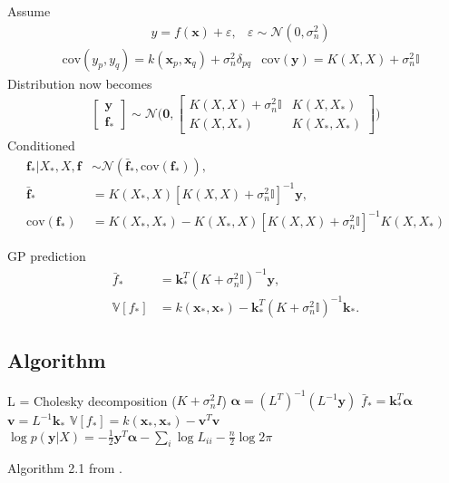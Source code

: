 \documentclass[twoside,english]{uiofysmaster}
\begin{document}
Assume
\begin{align}
&y = f(\textbf{x}) + \varepsilon, &\varepsilon \sim \mathcal{N}(0, \sigma_n^2)
\end{align}
\begin{align}
&\text{cov}(y_p, y_q) = k(\textbf{x}_p, \textbf{x}_q) + \sigma_n^2 \delta_{pq} &\text{cov}(\textbf{y}) = K(X, X) + \sigma_n^2 \mathbb{I}
\end{align}
Distribution now becomes
\begin{align}
\begin{bmatrix}
\textbf{y}\\
\textbf{f}_*
\end{bmatrix}
\sim 
\mathcal{N} \Bigg(
\boldsymbol{0},
\begin{bmatrix}
K(X, X) + \sigma_n^2 \mathbb{I} & K(X, X_*)\\
K(X, X_*) & K(X_*, X_*)
\end{bmatrix}
 \Bigg)
\end{align}
Conditioned
\begin{align}
\textbf{f}_* \big| X_*, X, \textbf{f} &\sim \mathcal{N}(\bar{\textbf{f}}_*, \text{cov}(\textbf{f}_*)),\\
\bar{\textbf{f}}_* &= K(X_*, X) [K(X, X) + \sigma_n^2 \mathbb{I}]^{-1} \textbf{y},\\
\text{cov} (\textbf{f}_*) &= K(X_*, X_*) - K(X_*, X)[K(X, X) + \sigma_n^2 \mathbb{I}]^{-1} K(X, X_*)
\end{align}

GP prediction
\begin{align}
\bar{f}_* &= \textbf{k}_*^T(K + \sigma_n^2\mathbb{I})^{-1} \textbf{y},\label{1}\\
\mathbb{V}[f_*] &= k(\textbf{x}_*, \textbf{x}_*) - \textbf{k}_*^T(K + \sigma_n^2 \mathbb{I})^{-1} \textbf{k}_*.
\end{align}

\subsection{Algorithm}

\begin{algorithm}
L = Cholesky decomposition ($K + \sigma_n^2 I$) \;
$\boldsymbol{\alpha} = (L^T)^{-1}(L^{-1} \textbf{y})$ \;
$\bar{f}_* = \textbf{k}_*^T \boldsymbol{\alpha}$ \;
$\textbf{v} = L^{-1} \textbf{k}_*$ \;
$\mathbb{V}[f_*] = k(\textbf{x}_*, \textbf{x}_*) - \textbf{v}^T \textbf{v}$ \;
$\log p(\textbf{y}|X) = - \frac{1}{2} \textbf{y}^T \boldsymbol{\alpha} - \sum_i \log L_{ii} - \frac{n}{2} \log 2 \pi$ \;
\caption{Algorithm 2.1 from \cite{rasmussen2006gaussian}.}
\label{Alg:: GP}
\end{algorithm}
\end{document}
